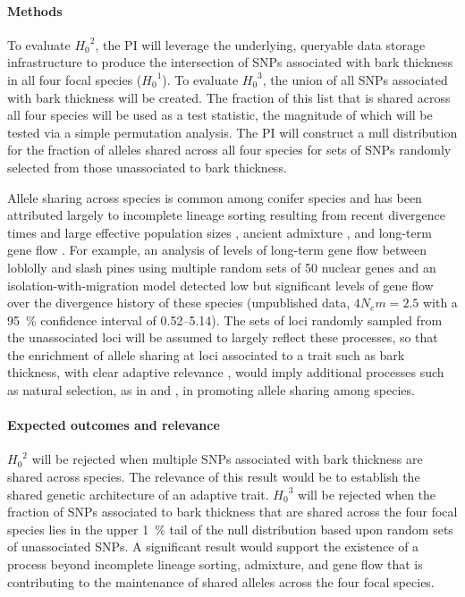 \paragraph{Methods} To evaluate ${H_0}^2$, the PI will leverage the underlying, queryable data storage infrastructure 
to produce the intersection of SNPs associated with bark thickness in all four focal species (${H_0}^1$). To 
evaluate ${H_{0}}^3$, the union of all SNPs associated with bark thickness will be created. The fraction of this list 
that is shared across all four species will be used as a test statistic, the magnitude of which will be tested via a simple 
permutation analysis. The PI will construct a null distribution for the fraction of alleles shared across all four species 
for sets of SNPs randomly selected from those unassociated to bark thickness. 

Allele sharing across species is common among conifer species and has been attributed largely to incomplete lineage 
sorting resulting from recent divergence times and large effective population sizes \citep{Syring:2007gd,Willyard:2009ez}, 
ancient admixture \citep{Liston:2007cx}, and long-term gene flow \citep{Zhou:2010hk}. For example, an analysis of 
levels of long-term gene flow between loblolly and slash pines using multiple random sets of 50 nuclear genes and an 
isolation-with-migration model \citep{Becquet:2007js} detected low but significant levels of gene flow over the divergence history 
of these species (unpublished data, $4 N_{e}m = 2.5$ with a \SI{95}{\percent} confidence interval of 0.52--5.14). The sets of loci 
randomly sampled from the unassociated loci will be assumed to largely reflect these processes, so that the 
enrichment of allele sharing at loci associated to a trait such as bark thickness, with clear adaptive relevance 
\citep{He:2012bz}, would imply additional processes such as natural selection, as in \citet{Segurel:vf} and 
\citet{Roux:2012eb}, in promoting allele sharing among species.

\paragraph{Expected outcomes and relevance} ${H_0}^2$ will be rejected when multiple SNPs associated 
with bark thickness are shared across species. The relevance of this result would be to establish the shared genetic 
architecture of an adaptive trait. ${H_0}^3$ will be rejected when the fraction of SNPs associated to bark thickness that are 
shared across the four focal species lies in the upper \SI{1}{\percent} tail of the null distribution based upon random sets of 
unassociated SNPs. A significant result would support the existence of a process beyond incomplete lineage sorting, 
admixture, and gene flow that is contributing to the maintenance of shared alleles across the four focal species. 

